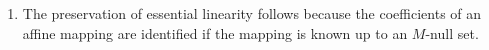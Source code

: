\begin{enumerate}[label=10.\arabic*]
\begin{ungradedsolution}
\begin{enumerate}
            \item The preservation of essential linearity follows because the coefficients of an affine mapping are identified if the mapping is known up to an $M$-null set.
        \end{enumerate}



\end{ungradedsolution}
\end{enumerate}

